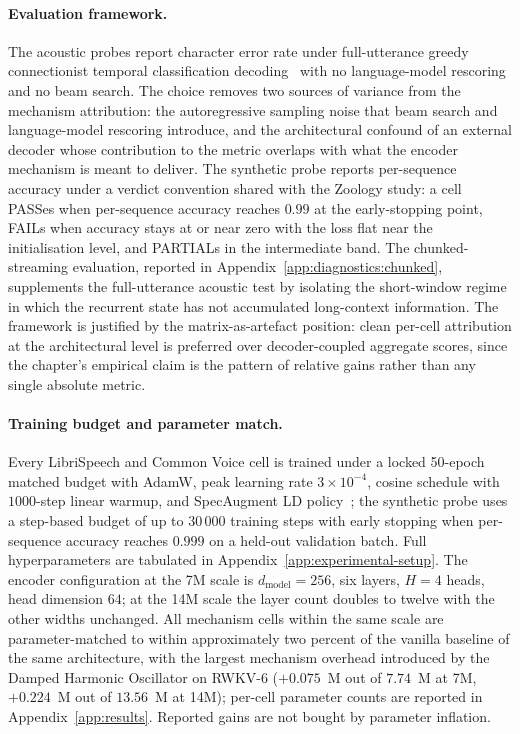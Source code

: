\paragraph{Evaluation framework.} The acoustic probes report
character error rate under full-utterance greedy connectionist
temporal classification decoding~\cite{graves2006ctc} with no
language-model rescoring and no beam search. The choice removes
two sources of variance from the mechanism attribution: the
autoregressive sampling noise that beam search and language-model
rescoring introduce, and the architectural confound of an
external decoder whose contribution to the metric overlaps with
what the encoder mechanism is meant to deliver. The synthetic
probe reports per-sequence accuracy under a verdict convention
shared with the Zoology study: a cell PASSes when per-sequence
accuracy reaches $0.99$ at the early-stopping point, FAILs when
accuracy stays at or near zero with the loss flat near the
initialisation level, and PARTIALs in the intermediate band. The
chunked-streaming evaluation, reported in
Appendix~\ref{app:diagnostics:chunked}, supplements the
full-utterance acoustic test by isolating the short-window regime
in which the recurrent state has not accumulated long-context
information. The framework is justified by the matrix-as-artefact
position: clean per-cell attribution at the architectural level
is preferred over decoder-coupled aggregate scores, since the
chapter's empirical claim is the pattern of relative gains rather
than any single absolute metric.

\paragraph{Training budget and parameter match.} Every
LibriSpeech and Common Voice cell is trained under a locked
50-epoch matched budget with AdamW, peak learning rate
$3 \times 10^{-4}$, cosine schedule with $1000$-step linear
warmup, and SpecAugment LD policy~\cite{park2019specaugment}; the
synthetic probe uses a step-based budget of up to $30\,000$
training steps with early stopping when per-sequence accuracy
reaches $0.999$ on a held-out validation batch. Full
hyperparameters are tabulated in
Appendix~\ref{app:experimental-setup}. The encoder configuration
at the 7M scale is $d_{\text{model}} = 256$, six layers,
$H = 4$ heads, head dimension $64$; at the 14M scale the layer
count doubles to twelve with the other widths unchanged. All
mechanism cells within the same scale are parameter-matched to
within approximately two percent of the vanilla baseline of the
same architecture, with the largest mechanism overhead introduced
by the Damped Harmonic Oscillator on RWKV-6 ($+0.075$~M out of
$7.74$~M at 7M, $+0.224$~M out of $13.56$~M at 14M); per-cell
parameter counts are reported in Appendix~\ref{app:results}.
Reported gains are not bought by parameter inflation.

